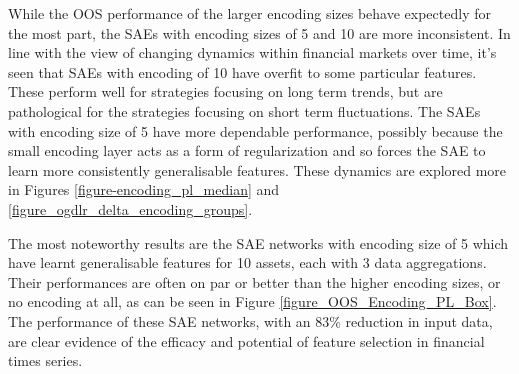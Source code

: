 \documentclass[a4paper,11pt,oneside]{article}
\theoremstyle{plain}
\theoremstyle{definition}
\begin{document}
	While the OOS performance of the larger encoding sizes behave expectedly for the most part, the SAEs with encoding sizes of 5 and 10 are more inconsistent. In line with the view of changing dynamics within financial markets over time, it's seen that SAEs with encoding of 10 have overfit to some particular features. These perform well for strategies focusing on long term trends, but are pathological for the strategies focusing on short term fluctuations. The SAEs with encoding size of 5 have more dependable performance, possibly because the small encoding layer acts as a form of regularization and so forces the SAE to learn more consistently generalisable features. These dynamics are explored more in Figures \ref{figure-encoding_pl_median} and \ref{figure_ogdlr_delta_encoding_groups}.  \newline
	
	The most noteworthy results are the SAE networks with encoding size of 5  which have learnt generalisable features for 10 assets, each with 3 data aggregations. Their performances are often on par or better than the higher encoding sizes, or no encoding at all, as can be seen in Figure \ref{figure_OOS_Encoding_PL_Box}. The performance of these SAE networks, with an 83\% reduction in input data, are clear evidence of the efficacy and potential of feature selection in financial times series.\newline
	
\end{document}
